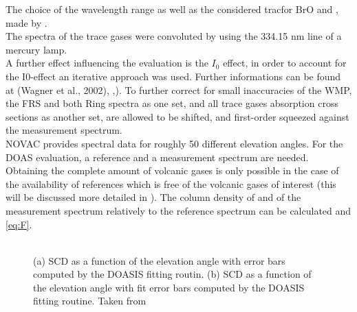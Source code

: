 \documentclass  [
  paper    = a4,
  BCOR     = 10mm,
  twoside,
  fontsize = 12pt,
  fleqn,
  toc      = bibnumbered,
  toc      = listofnumbered,
  numbers  = noendperiod,
  headings = normal,
  listof   = leveldown,
  version  = 3.03
]                                       {scrreprt}
\begin{document}
%
The choice of the wavelength range as well as the considered tracfor BrO and , made by \citet{vogel2011volcanic}.\\
The spectra of the trace gases were convoluted by using the 334.15 nm line of a mercury lamp.\\
A further effect influencing the evaluation is the $I_{0}$ effect, in order to account for the I0-effect \citep{platt2008differential} an iterative approach was used. Further informations can be found at (Wagner et al., 2002), \cite{lubcke2014bro},\cite{vogel2011volcanic}).
To further correct for small inaccuracies of the WMP, the FRS and both Ring spectra as one set, and all trace gases absorption cross sections as another set, are allowed to be shifted, and first-order squeezed against the measurement spectrum.\\
%
NOVAC provides spectral data for roughly 50 different elevation angles. For the DOAS evaluation, a reference and a measurement spectrum are needed. Obtaining the complete amount of volcanic gases is only possible in the case of the availability of references which is free of the volcanic gases of interest (this will be discussed more detailed in ). The column density of    and  of the measurement spectrum relatively to the reference spectrum can be calculated  and \ref{eq:F}. \\
\\
\begin{figure}[h]
	\caption[(a)  SCD as a function of the elevation angle with error bars computed by the DOASIS fitting routin. (b)  SCD as a function of the elevation angle computed by the DOASIS fitting routine.  Taken from \cite{WarnachSimon}]{(a)  SCD as a function of the elevation angle with error bars computed by the DOASIS fitting routin. (b)  SCD as a function of the elevation angle with fit error bars computed by the DOASIS fitting routine.  Taken from \cite{WarnachSimon}}
	\label{fig:plumeref}
\end{figure}
\end{document}
